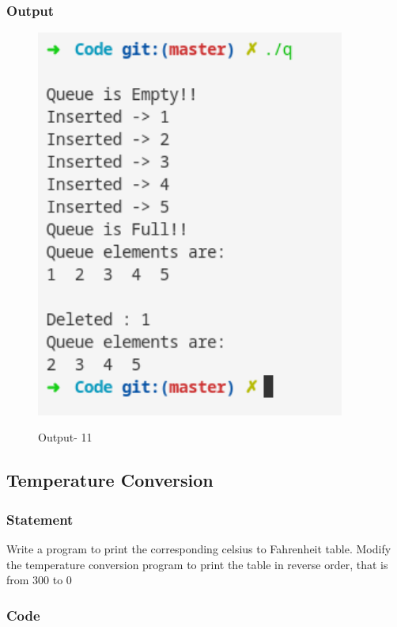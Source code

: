 \subsubsection{Output}
\begin{figure}[!htb]
  \centering
  \includegraphics[width=4in]{Images/q.png}
  \label{Output-11}
  \caption{Output- 11}
\end{figure}


\pagebreak
\subsection{Temperature Conversion}
\subsubsection{Statement}
Write a program to print the corresponding celsius to Fahrenheit table. Modify the
temperature conversion program to print the table in reverse order, that is from 300 to 0
\subsubsection{Code}
\inputminted[]{c}{'../Code/temperature.cpp'}
